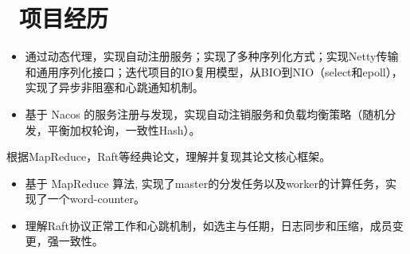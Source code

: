 \documentclass{resume}
\begin{document}
\section{\faUsers\ 项目经历}
\begin{itemize}
  \item 通过动态代理，实现自动注册服务；实现了多种序列化方式；实现Netty传输和通用序列化接口；迭代项目的IO复用模型，从BIO到NIO（select和epoll），实现了异步非阻塞和心跳通知机制。
  \item 基于 Nacos 的服务注册与发现，实现自动注销服务和负载均衡策略（随机分发，平衡加权轮询，一致性Hash）。
\end{itemize}

\vspace{-1.5ex}

\begin{onehalfspacing}
根据MapReduce，Raft等经典论文，理解并复现其论文核心框架。
\begin{itemize}
  \item 基于 MapReduce 算法, 实现了master的分发任务以及worker的计算任务，实现了一个word-counter。
  \item 理解Raft协议正常工作和心跳机制，如选主与任期，日志同步和压缩，成员变更，强一致性。
\end{itemize}
\end{onehalfspacing}


\vspace{-1.5ex}
\end{document}
